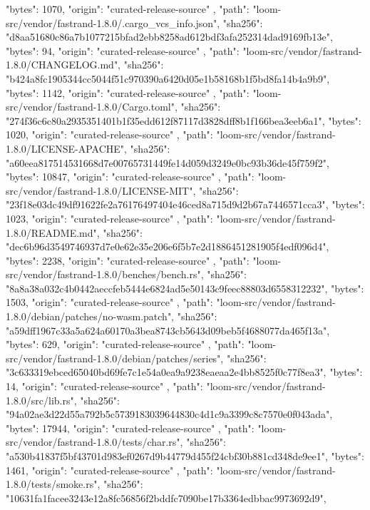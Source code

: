 {{      "bytes": 1070,
      "origin": "curated-release-source"
    },
    {
      "path": "loom-src/vendor/fastrand-1.8.0/.cargo_vcs_info.json",
      "sha256": "d8aa51680c86a7b1077215bfad2ebb8258ad612bdf3afa252314dad9169fb13e",
      "bytes": 94,
      "origin": "curated-release-source"
    },
    {
      "path": "loom-src/vendor/fastrand-1.8.0/CHANGELOG.md",
      "sha256": "b424a8fc1905344cc5044f51c970390a6420d05e1b58168b1f5bd8fa14b4a9b9",
      "bytes": 1142,
      "origin": "curated-release-source"
    },
    {
      "path": "loom-src/vendor/fastrand-1.8.0/Cargo.toml",
      "sha256": "274f36c6c80a2935351401b1f35edd612f87117d3828dff8b1f166bea3eeb6a1",
      "bytes": 1020,
      "origin": "curated-release-source"
    },
    {
      "path": "loom-src/vendor/fastrand-1.8.0/LICENSE-APACHE",
      "sha256": "a60eea817514531668d7e00765731449fe14d059d3249e0bc93b36de45f759f2",
      "bytes": 10847,
      "origin": "curated-release-source"
    },
    {
      "path": "loom-src/vendor/fastrand-1.8.0/LICENSE-MIT",
      "sha256": "23f18e03dc49df91622fe2a76176497404e46ced8a715d9d2b67a7446571cca3",
      "bytes": 1023,
      "origin": "curated-release-source"
    },
    {
      "path": "loom-src/vendor/fastrand-1.8.0/README.md",
      "sha256": "dec6b96d3549746937d7e0e62e35e206e6f5b7e2d1886451281905f4edf096d4",
      "bytes": 2238,
      "origin": "curated-release-source"
    },
    {
      "path": "loom-src/vendor/fastrand-1.8.0/benches/bench.rs",
      "sha256": "8a8a38a032c4b0442aeccfeb5444e6824ad5e50143c9feec88803d6558312232",
      "bytes": 1503,
      "origin": "curated-release-source"
    },
    {
      "path": "loom-src/vendor/fastrand-1.8.0/debian/patches/no-wasm.patch",
      "sha256": "a59dff1967c33a5a624a60170a3bea8743cb5643d09beb5f4688077da465f13a",
      "bytes": 629,
      "origin": "curated-release-source"
    },
    {
      "path": "loom-src/vendor/fastrand-1.8.0/debian/patches/series",
      "sha256": "3c633319ebced65040bd69fe7c1e54a0ea9a9238eaeaa2e4bb8525f0c77f8ea3",
      "bytes": 14,
      "origin": "curated-release-source"
    },
    {
      "path": "loom-src/vendor/fastrand-1.8.0/src/lib.rs",
      "sha256": "94a02ae3d22d55a792b5c5739183039644830c4d1c9a3399c8c7570e0f043ada",
      "bytes": 17944,
      "origin": "curated-release-source"
    },
    {
      "path": "loom-src/vendor/fastrand-1.8.0/tests/char.rs",
      "sha256": "a530b41837f5bf43701d983ef0267d9b44779d455f24cbf30b881cd348de9ee1",
      "bytes": 1461,
      "origin": "curated-release-source"
    },
    {
      "path": "loom-src/vendor/fastrand-1.8.0/tests/smoke.rs",
      "sha256": "10631fa1facee3243e12a8fc56856f2bddfc7090be17b3364edbbac9973692d9",
}}
